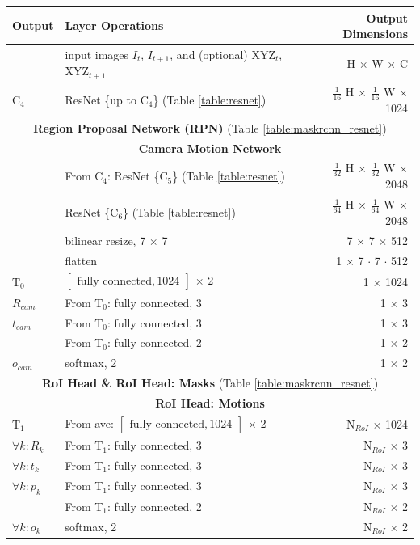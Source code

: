 {\begin{table}[h]
\centering
\begin{tabular}{llr}
\toprule
\textbf{Output} & \textbf{Layer Operations} & \textbf{Output Dimensions} \\
\midrule\midrule
& input images $I_t$, $I_{t+1}$, and (optional) XYZ$_{t}$, XYZ$_{t+1}$ & H $\times$ W $\times$ C \\
\midrule
C$_4$ & ResNet \{up to C$_4$\} (Table \ref{table:resnet}) & $\tfrac{1}{16}$ H $\times$ $\tfrac{1}{16}$ W $\times$ 1024 \\
\midrule
\multicolumn{3}{c}{\textbf{Region Proposal Network (RPN)} (Table \ref{table:maskrcnn_resnet})}\\
\midrule
\multicolumn{3}{c}{\textbf{Camera Motion Network}}\\
\midrule
& From C$_4$: ResNet \{C$_5$\} (Table \ref{table:resnet}) & $\tfrac{1}{32}$ H $\times$ $\tfrac{1}{32}$ W $\times$ 2048 \\
& ResNet \{C$_6$\} (Table \ref{table:resnet}) & $\tfrac{1}{64}$ H $\times$ $\tfrac{1}{64}$ W $\times$ 2048 \\
& bilinear resize, 7 $\times$ 7 & 7 $\times$ 7 $\times$ 512 \\
& flatten & 1 $\times$ 7 $\cdot$ 7 $\cdot$ 512 \\
T$_0$ & $\begin{bmatrix}\textrm{fully connected}, 1024\end{bmatrix}$ $\times$ 2  & 1 $\times$ 1024 \\

$R_{cam}$& From T$_0$: fully connected, 3 & 1 $\times$ 3 \\
$t_{cam}$& From T$_0$: fully connected, 3 & 1 $\times$ 3 \\
& From T$_0$: fully connected, 2 & 1 $\times$ 2 \\
$o_{cam}$& softmax, 2 & 1 $\times$ 2 \\
\midrule
\multicolumn{3}{c}{\textbf{RoI Head \& RoI Head: Masks} (Table \ref{table:maskrcnn_resnet})}\\
\midrule
\multicolumn{3}{c}{\textbf{RoI Head: Motions}}\\
\midrule
T$_1$ & From ave: $\begin{bmatrix}\textrm{fully connected}, 1024\end{bmatrix}$ $\times$ 2 & N$_{RoI}$ $\times$ 1024 \\
$\forall k: R_k$ & From T$_1$: fully connected, 3 & N$_{RoI}$ $\times$ 3 \\
$\forall k: t_k$ & From T$_1$: fully connected, 3 & N$_{RoI}$ $\times$ 3 \\
$\forall k: p_k$ & From T$_1$: fully connected, 3 & N$_{RoI}$ $\times$ 3 \\
& From T$_1$: fully connected, 2 & N$_{RoI}$ $\times$ 2 \\
$\forall k: o_k$ & softmax, 2 & N$_{RoI}$ $\times$ 2 \\


\end{tabular}
\end{table}}
